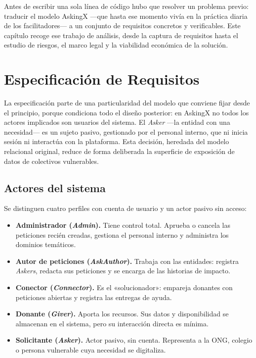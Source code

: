 \documentclass[11pt,oneside,spanish,listoffigures,listoftables]{tfgetsinf}
\begin{document}
Antes de escribir una sola línea de código hubo que resolver un problema previo: traducir el modelo AskingX —que hasta ese momento vivía en la práctica diaria de los facilitadores— a un conjunto de requisitos concretos y verificables. Este capítulo recoge ese trabajo de análisis, desde la captura de requisitos hasta el estudio de riesgos, el marco legal y la viabilidad económica de la solución.

\section{Especificación de Requisitos}

La especificación parte de una particularidad del modelo que conviene fijar desde el principio, porque condiciona todo el diseño posterior: en AskingX no todos los actores implicados son usuarios del sistema. El \textit{Asker} —la entidad con una necesidad— es un sujeto pasivo, gestionado por el personal interno, que ni inicia sesión ni interactúa con la plataforma. Esta decisión, heredada del modelo relacional original, reduce de forma deliberada la superficie de exposición de datos de colectivos vulnerables.

\subsection{Actores del sistema}

Se distinguen cuatro perfiles con cuenta de usuario y un actor pasivo sin acceso:

\begin{itemize}
    \item \textbf{Administrador (\textit{Admin}).} Tiene control total. Aprueba o cancela las peticiones recién creadas, gestiona el personal interno y administra los dominios temáticos.
    \item \textbf{Autor de peticiones (\textit{AskAuthor}).} Trabaja con las entidades: registra \textit{Askers}, redacta sus peticiones y se encarga de las historias de impacto.
    \item \textbf{Conector (\textit{Connector}).} Es el «solucionador»: empareja donantes con peticiones abiertas y registra las entregas de ayuda.
    \item \textbf{Donante (\textit{Giver}).} Aporta los recursos. Sus datos y disponibilidad se almacenan en el sistema, pero su interacción directa es mínima.
    \item \textbf{Solicitante (\textit{Asker}).} Actor pasivo, sin cuenta. Representa a la ONG, colegio o persona vulnerable cuya necesidad se digitaliza.
\end{itemize}
\end{document}

